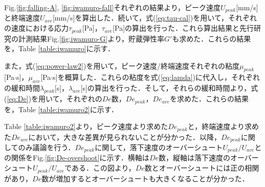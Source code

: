 Fig.\ref{fig:falling-A}, \ref{fig:iwamuro-fall}それぞれの結果より，ピーク速度$U_{peak}$[mm/s]と終端速度$U_{ave}$[mm/s]を算出した．続いて，式(\ref{eq:tau-cal})を用いて，それぞれの速度における応力$\tau_{peak}$[Pa]，$\tau_{ave}$[Pa]の算出を行った．これら算出結果と先行研究の計測結果Fig.\ref{fig:iwamuro-G}より，貯蔵弾性率$G'$も求めた．これらの結果を，Table \ref{table:iwamuro}に示す．

また，式(\ref{eq:power-law2})を用いて，ピーク速度/終端速度それぞれの粘度$\mu_{peak}$[Pa$\cdot$s]，$\mu_{ave}$[Pa$\cdot$s]を概算した．これらの粘度を式(\ref{eq:lamda})に代入し，それぞれの緩和時間$\lambda_{peak}$[s]，$\lambda_{ave}$[s]の算出を行った．そして，それらの緩和時間より，式(\ref{eq:De})を用いて，それぞれの$De$数，$De_{peak}$，$De_{ave}$を求めた．これらの結果を，Table \ref{table:iwamuro2}に示す．

Table \ref{table:iwamuro2}より，ピーク速度より求めた$De_{peak}$と，終端速度より求めた$De_{ave}$において，大きな差異が見られないことが分かった．以降，$De_{peak}$に関してのみ議論を行う．$De_{peak}$に関して，落下速度のオーバーシュート$U_{peak}/U_{ave}$との関係をFig.\ref{fig:De-overshoot}に示す．横軸は$De$数，縦軸は落下速度のオーバーシュート$U_{peak}/U_{ave}$である．この図より，$De$数とオーバーシュートには正の相関があり，$De$数が増加するとオーバーシュートも大きくなることが分かった．

